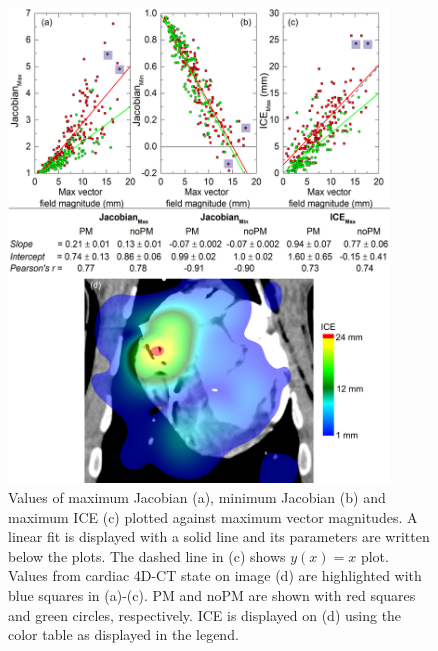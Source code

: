 
\begin{figure}[H]
	\begin{center}		
		\includegraphics[width=0.9\textwidth]{./Vmm/Images/MaxVfdata_pigs.png}
		\caption{Values of maximum Jacobian (a), minimum Jacobian (b) and maximum ICE (c) plotted against maximum vector magnitudes. A linear fit is displayed with a solid line and
		its parameters are written below the plots. The dashed line in (c) shows $y(x)= x$ plot. Values from cardiac 4D-CT state on image (d) are highlighted with blue squares in (a)-(c). PM and noPM are shown with red squares and green circles, respectively.
			ICE is displayed on (d) using the color table as displayed in the legend.}
		\label{maxvf_pigs}
	\end{center}
\end{figure}


